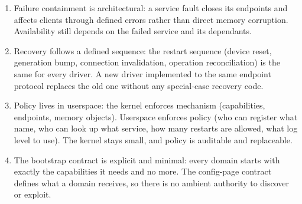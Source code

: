 \begin{enumerate}
    \item Failure containment is architectural: a service fault closes
        its endpoints and affects clients through defined errors rather than
        direct memory corruption. Availability still depends on the failed
        service and its dependants.

    \item Recovery follows a defined sequence: the restart sequence
        (device reset, generation bump, connection invalidation, operation
        reconciliation) is the same for every driver. A new driver
        implemented to the same endpoint protocol replaces the old one
        without any special-case recovery code.

    \item Policy lives in userspace: the kernel enforces mechanism
        (capabilities, endpoints, memory objects). Userspace enforces policy
        (who can register what name, who can look up what service, how
        many restarts are allowed, what log level to use). The kernel
        stays small, and policy is auditable and replaceable.

    \item The bootstrap contract is explicit and minimal: every
        domain starts with exactly the capabilities it needs and no more.
        The config-page contract defines what a domain receives, so there is no
        ambient authority to discover or exploit.
\end{enumerate}

\endinput
